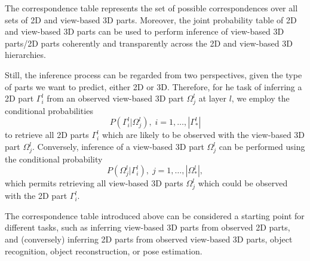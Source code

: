 \documentclass[runningheads]{llncs}
\begin{document}
The correspondence table represents the set of possible correspondences over all sets of 2D and view-based 3D parts.  
Moreover, the joint probability table of 2D and view-based 3D parts can be used to perform inference of view-based 3D parts/2D parts coherently and transparently across the 2D and view-based 3D hierarchies.

Still, the inference process can be regarded from two perspectives, given the type of parts we want to predict, either 2D or 3D. 
Therefore, for he task of inferring a 2D part $\Gamma_i^l$ from an observed view-based 3D part $\Omega_j^l$ at layer $l$, we employ the conditional probabilities
\begin{equation}
P(\Gamma_i^l \vert \Omega_j^l), \;i=1,\dots,|\Gamma_*^l|
\label{eqn:PGO.Bayes}
\end{equation}
to retrieve all 2D parts $\Gamma_i^l$ which are likely to be observed
with the view-based 3D part $\Omega_j^l$.  
Conversely, inference of a view-based 3D part $\Omega_j^l$ can be performed using the conditional probability
\begin{equation}
 P(\Omega_j^l \vert \Gamma_i^l), \;j=1,\dots,|\Omega_*^l|,
\end{equation} 
which permits retrieving all view-based 3D parts $\Omega_j^l$ which could be observed with the 2D part $\Gamma_i^l$. 
 
The correspondence table introduced above can be considered a starting point for different tasks, such as inferring view-based 3D parts from observed 2D parts, and (conversely) inferring 2D parts from observed view-based 3D parts, object recognition, object reconstruction, or pose estimation. 

\end{document}
